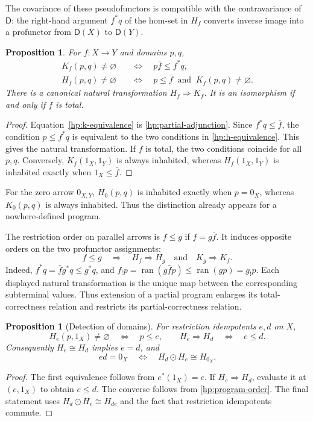 \documentclass[11pt]{article}
\newtheorem{proposition}[theorem]{Proposition}
\theoremstyle{definition}
\theoremstyle{remark}
\newcommand{\D}{\mathsf D}
\newcommand{\ran}{\operatorname{ran}}
\begin{document}
The covariance of these pseudofunctors is compatible with the
contravariance of $\D$: the right-hand argument $f^*q$ of the hom-set in
$H_f$ converts inverse image into a profunctor from $\D(X)$ to
$\D(Y)$.

\begin{proposition}\label{hp:hoare-comparison}
For $f:X\to Y$ and domains $p,q$,
\begin{align}
 K_f(p,q)\ne\varnothing
 &\quad\Longleftrightarrow\quad p\bar f\le f^*q,
 \label{hp:k-equivalence}\\
 H_f(p,q)\ne\varnothing
 &\quad\Longleftrightarrow\quad
 p\le\bar f\ \text{ and }\ K_f(p,q)\ne\varnothing.
 \label{hp:h-equivalence}
\end{align}
There is a canonical natural transformation $H_f\Rightarrow K_f$.
It is an isomorphism if and only if $f$ is total.
\end{proposition}
\begin{proof}
Equation~\eqref{hp:k-equivalence} is
\eqref{hp:partial-adjunction}. Since $f^*q\le\bar f$,
the condition $p\le f^*q$ is equivalent to the two conditions in
\eqref{hp:h-equivalence}. This gives the natural transformation.
If $f$ is total, the two conditions coincide for all $p,q$.
Conversely, $K_f(1_X,1_Y)$ is always inhabited, whereas
$H_f(1_X,1_Y)$ is inhabited exactly when $1_X\le\bar f$.
\end{proof}

For the zero arrow $0_{X,Y}$, $H_0(p,q)$ is inhabited exactly when
$p=0_X$, whereas $K_0(p,q)$ is always inhabited. Thus the distinction
already appears for a nowhere-defined program.

The restriction order on parallel arrows is
$f\le g$ if $f=g\bar f$. It induces opposite orders on the two
profunctor assignments:
\begin{equation}\label{hp:program-order}
 f\le g\quad\Longrightarrow\quad
 H_f\Rightarrow H_g\quad\text{and}\quad K_g\Rightarrow K_f.
\end{equation}
Indeed, $f^*q=\bar f g^*q\le g^*q$, and
$f_!p=\ran(g\bar fp)\le\ran(gp)=g_!p$. Each displayed natural
transformation is the unique map between the corresponding subterminal
values. Thus extension of a partial program enlarges its total-correctness
relation and restricts its partial-correctness relation.

\begin{proposition}[Detection of domains]\label{hp:detect-domains}
For restriction idempotents $e,d$ on $X$,
\[
 H_e(p,1_X)\ne\varnothing\quad\Longleftrightarrow\quad p\le e,
 \qquad
 H_e\Rightarrow H_d\quad\Longleftrightarrow\quad e\le d.
\]
Consequently $H_e\cong H_d$ implies $e=d$, and
\[
 ed=0_X\quad\Longleftrightarrow\quad H_d\odot H_e\cong H_{0_X}.
\]
\end{proposition}
\begin{proof}
The first equivalence follows from $e^*(1_X)=e$.
If $H_e\Rightarrow H_d$, evaluate it at $(e,1_X)$ to obtain $e\le d$.
The converse follows from \eqref{hp:program-order}. The final statement
uses $H_d\odot H_e\cong H_{de}$ and the fact that restriction
idempotents commute.
\end{proof}
\end{document}

